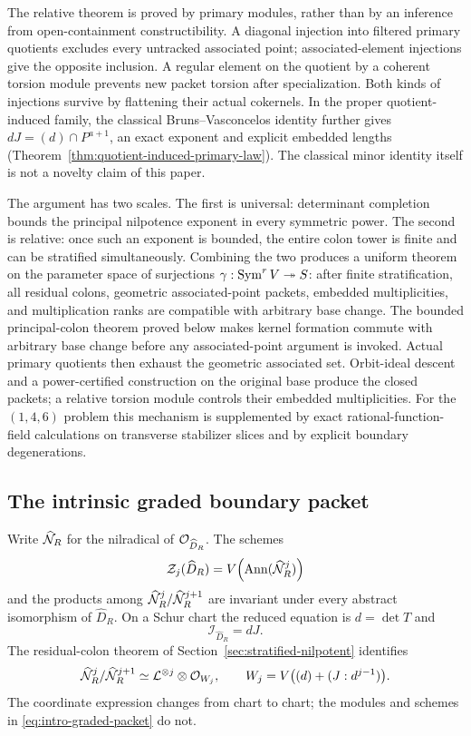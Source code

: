The relative theorem is proved by primary modules, rather than by an
inference from open-containment constructibility.  A diagonal
injection into filtered primary quotients excludes every untracked
associated point; associated-element injections give the opposite
inclusion.  A regular element on the quotient by a coherent torsion
module prevents new packet torsion after specialization.  Both kinds
of injections survive by flattening their actual cokernels.
In the proper quotient-induced family, the classical
Bruns--Vasconcelos identity \cite{BrunsVasconcelos} further gives
\(dJ=(d)\cap P^{a+1}\), an exact exponent and explicit embedded
lengths (Theorem~\ref{thm:quotient-induced-primary-law}).  The
classical minor identity itself is not a novelty claim of this paper.

The argument has two scales.  The first is universal: determinant
completion bounds the principal nilpotence exponent in every symmetric
power.  The second is relative: once such an exponent is bounded, the
entire colon tower is finite and can be stratified simultaneously.
Combining the two produces a uniform theorem on the parameter space of
surjections \(\gamma:\operatorname{Sym}^rV\twoheadrightarrow S\): after finite
stratification, all residual colons, geometric associated-point packets,
embedded multiplicities, and multiplication ranks are compatible with
arbitrary base change.
The bounded principal-colon theorem proved below makes kernel formation
commute with arbitrary base change before any associated-point
argument is invoked.  Actual primary quotients then exhaust the geometric associated set.
Orbit-ideal descent and a power-certified construction on the
original base produce the closed packets; a relative torsion module
controls their embedded multiplicities.
For the \((1,4,6)\) problem this mechanism is supplemented by exact
rational-function-field calculations on transverse stabilizer slices
and by explicit boundary degenerations.



\subsection{The intrinsic graded boundary packet}

Write \(\widehat{\mathcal N}_R\) for the nilradical of
\(\mathcal O_{\widehat D_R}\).  The schemes
\[
 \mathcal Z_j(\widehat D_R)=
 V\!\left(\operatorname{Ann}(\widehat{\mathcal N}_R^{j})\right)
\]
and the products among
\(\widehat{\mathcal N}_R^j/\widehat{\mathcal N}_R^{j+1}\) are invariant under
every abstract isomorphism of \(\widehat D_R\).  On a Schur chart
the reduced equation is \(d=\det T\) and
\[
 \mathcal I_{\widehat D_R}=dJ.
\]
The residual-colon theorem of Section~\ref{sec:stratified-nilpotent}
identifies
\begin{equation}\label{eq:intro-graded-packet}
 \widehat{\mathcal N}_R^j/\widehat{\mathcal N}_R^{j+1}
 \simeq
 \mathcal L^{\otimes j}\otimes\mathcal O_{W_j},\qquad
 W_j=V\bigl((d)+(J:d^{j-1})\bigr).
\end{equation}
The coordinate expression changes from chart to chart; the modules
and schemes in \eqref{eq:intro-graded-packet} do not.

